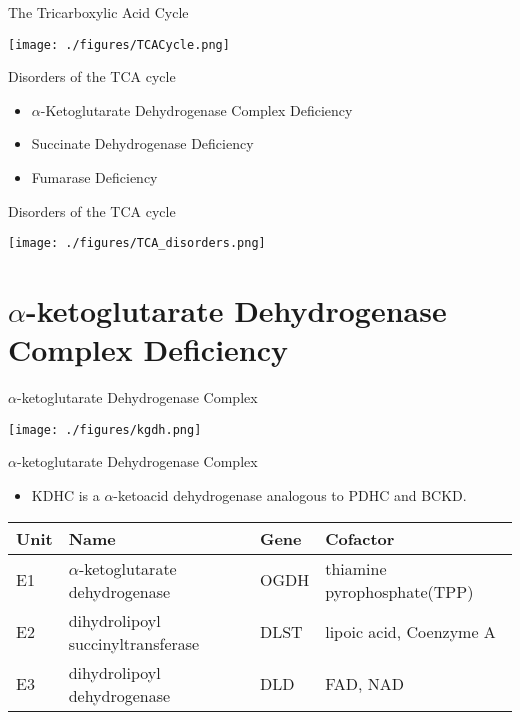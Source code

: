 \documentclass[presentation, smaller]{beamer}
\begin{document}
\begin{frame}[label={sec:org7131712}]{The Tricarboxylic Acid Cycle}
\begin{center}
\texttt{[image: ./figures/TCACycle.png]}
\end{center}

\tiny
{}
\end{frame}

\begin{frame}[label={sec:orgf2f195b}]{Disorders of the TCA cycle}
\begin{itemize}
\item \(\alpha\)-Ketoglutarate Dehydrogenase Complex Deficiency
\item Succinate Dehydrogenase Deficiency
\item Fumarase Deficiency
\end{itemize}
\end{frame}

\begin{frame}[label={sec:org1a209cc}]{Disorders of the TCA cycle}
\begin{center}
\texttt{[image: ./figures/TCA\_disorders.png]}
\end{center}
\end{frame}


\section{\(\alpha\)-ketoglutarate Dehydrogenase Complex Deficiency}
\label{sec:org15ddcc3}
\begin{frame}[label={sec:orgece36cf}]{\(\alpha\)-ketoglutarate Dehydrogenase Complex}
\begin{center}
\texttt{[image: ./figures/kgdh.png]}
\end{center}
\end{frame}

\begin{frame}[label={sec:org1f57f0d}]{\(\alpha\)-ketoglutarate Dehydrogenase Complex}
\begin{itemize}
\item KDHC is a \(\alpha\)-ketoacid dehydrogenase analogous to PDHC and BCKD.
\end{itemize}



\begin{center}
\begin{tabular}{llll}
Unit & Name & Gene & Cofactor\\
\hline
E1 & \(\alpha\)-ketoglutarate dehydrogenase & OGDH & thiamine pyrophosphate(TPP)\\
E2 & dihydrolipoyl succinyltransferase & DLST & lipoic acid, Coenzyme A\\
E3 & dihydrolipoyl dehydrogenase & DLD & FAD, NAD\\
\end{tabular}
\end{center}
\end{frame}
\end{document}
